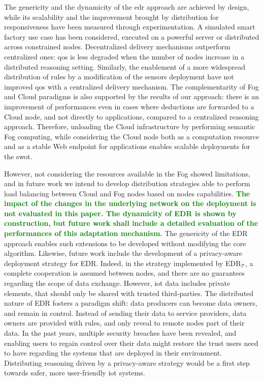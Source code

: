 \documentclass{iosart2c}
\newcommand{\edr}{EDR\xspace}
\newcommand{\edrt}{EDR$_{\mathcal{T}}$\xspace}
\newcommand{\added}[1]{\textcolor{green}{\textbf{#1}}}
\begin{document}
The genericity and the dynamicity of the \gls{edr} approach are achieved by design, while its scalability and the improvement brought by distribution for responsiveness have been measured through experimentation.
A simulated smart factory use case has been considered, executed on a powerful server or distributed across constrained nodes.
Decentralized delivery mechanisms outperform centralized ones: \gls{qos} is less degraded when the number of nodes increase in a distributed reasoning setting.
Similarly, the enablement of a more widespread distribution of rules by a modification of the sensors deployment have not improved \gls{qos} with a centralized delivery mechanism.
The complementarity of Fog and Cloud paradigms is also supported by the results of our approach: there is an improvement of performances even in cases where deductions are forwarded to a Cloud node, and not directly to applications, compared to a centralized reasoning approach.
Therefore, unloading the Cloud infrastructure by performing semantic Fog computing, while considering the Cloud node both as a computation resource and as a stable Web endpoint for applications enables scalable deployments for the \gls{swot}.

However, not considering the resources available in the Fog showed limitations, and in future work we intend to develop distribution strategies able to perform load balancing between Cloud and Fog nodes based on nodes capabilities.
\added{
The impact of the changes in the underlying network on the deployment is not evaluated in this paper.
The dynamicity of \edr is shown by construction, but future work shall include a detailed evaluation of the performances of this adaptation mechanism.
}
The genericity of the \edr approach enables such extensions to be developed without modifying the core algorithm.
Likewise, future work include the development of a privacy-aware deployment strategy for \edr.
Indeed, in the strategy implemented by \edrt, a complete cooperation is assumed between nodes, and there are no guarantees regarding the scope of data exchange.
However, \gls{iot} data includes private elements, that should only be shared with trusted third-parties.
The distributed nature of \edr fosters a paradigm shift: data producers can become data owners, and remain in control. 
Instead of sending their data to service providers, data owners are provided with rules, and only reveal to remote nodes part of their data.
In the past years, multiple security breaches have been revealed, and enabling users to regain control over their data might restore the trust users need to have regarding the systems that are deployed in their environment.
Distributing reasoning driven by a privacy-aware strategy would be a first step towards safer, more user-friendly \gls{iot} systems.
\end{document}
